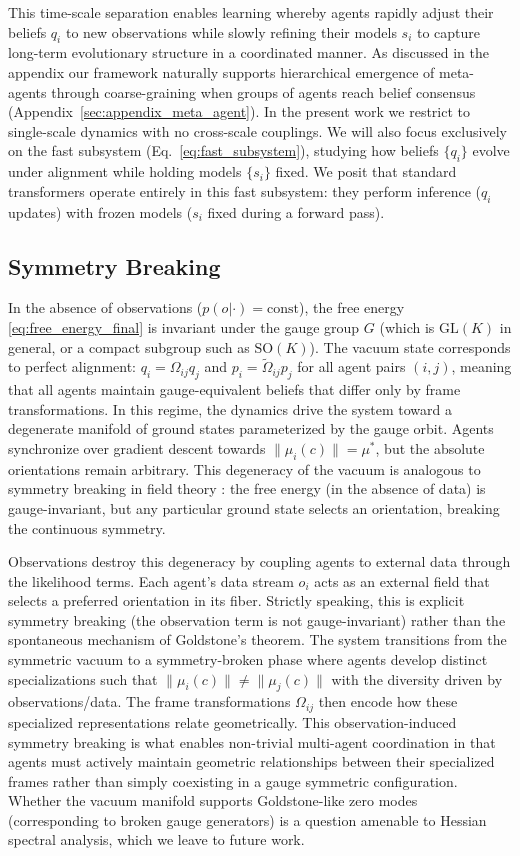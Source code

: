 \documentclass[twoside,11pt]{article}
\begin{document}
This time-scale separation enables learning whereby agents rapidly adjust their beliefs $q_i$ to new observations while slowly refining their models $s_i$ to capture long-term evolutionary structure in a coordinated manner. As discussed in the appendix our framework naturally supports hierarchical emergence of meta-agents through coarse-graining when groups of agents reach belief consensus (Appendix~\ref{sec:appendix_meta_agent}). In the present work we restrict to single-scale dynamics with no cross-scale couplings. We will also focus exclusively on the fast subsystem (Eq.~\ref{eq:fast_subsystem}), studying how beliefs $\{q_i\}$ evolve under alignment while holding models $\{s_i\}$ fixed. We posit that standard transformers operate entirely in this fast subsystem: they perform inference ($q_i$ updates) with frozen models ($s_i$ fixed during a forward pass).

\subsection{Symmetry Breaking}
\label{sec:symmetry_breaking}
In the absence of observations ($p(o|\cdot) = \text{const}$), the free energy \eqref{eq:free_energy_final} is invariant under the gauge group $G$ (which is $\mathrm{GL}(K)$ in general, or a compact subgroup such as $\mathrm{SO}(K)$). The vacuum state corresponds to perfect alignment: $q_i = \Omega_{ij}q_j$ and $p_i = \tilde{\Omega}_{ij}p_j$ for all agent pairs $(i,j)$, meaning that all agents maintain gauge-equivalent beliefs that differ only by frame transformations. In this regime, the dynamics drive the system toward a degenerate manifold of ground states parameterized by the gauge orbit. Agents synchronize over gradient descent towards $\|\mu_i(c)\| = \mu^*$, but the absolute orientations remain arbitrary. This degeneracy of the vacuum is analogous to symmetry breaking in field theory \citep{weinberg1995quantum,goldstone1962field}: the free energy (in the absence of data) is gauge-invariant, but any particular ground state selects an orientation, breaking the continuous symmetry.

Observations destroy this degeneracy by coupling agents to external data through the likelihood terms. Each agent's data stream $o_i$ acts as an external field that selects a preferred orientation in its fiber. Strictly speaking, this is explicit symmetry breaking (the observation term is not gauge-invariant) rather than the spontaneous mechanism of Goldstone's theorem. The system transitions from the symmetric vacuum to a symmetry-broken phase where agents develop distinct specializations such that $\|\mu_i(c)\| \neq \|\mu_j(c)\|$ with the diversity driven by observations/data. The frame transformations $\Omega_{ij}$ then encode how these specialized representations relate geometrically. This observation-induced symmetry breaking is what enables non-trivial multi-agent coordination in that agents must actively maintain geometric relationships between their specialized frames rather than simply coexisting in a gauge symmetric configuration. Whether the vacuum manifold supports Goldstone-like zero modes (corresponding to broken gauge generators) is a question amenable to Hessian spectral analysis, which we leave to future work.
\end{document}
